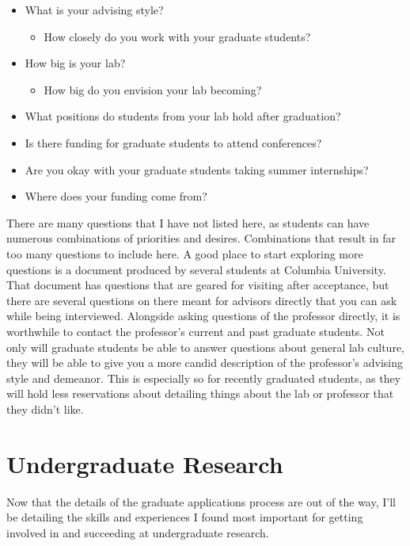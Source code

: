 \documentclass[12pt]{article}
\begin{document}
\begin{itemize}
    \item What is your advising style?
    \begin{itemize}
        \item How closely do you work with your graduate students?
    \end{itemize}
    \item How big is your lab?
    \begin{itemize}
        \item How big do you envision your lab becoming?
    \end{itemize}
    \item What positions do students from your lab hold after graduation?
    \item Is there funding for graduate students to attend conferences?
    \item Are you okay with your graduate students taking summer internships?
    \item Where does your funding come from?
\end{itemize}

There are many questions that I have not listed here, as students can have numerous combinations of priorities and desires. Combinations that result in far too many questions to include here. A good place to start exploring more questions is a document produced by several students at Columbia University. \cite{columbiaquestions} That document has questions that are geared for visiting after acceptance, but there are several questions on there meant for advisors directly that you can ask while being interviewed. Alongside asking questions of the professor directly, it is worthwhile to contact the professor's current and past graduate students. Not only will graduate students be able to answer questions about general lab culture, they will be able to give you a more candid description of the professor's advising style and demeanor. This is especially so for recently graduated students, as they will hold less reservations about detailing things about the lab or professor that they didn't like.

\section{Undergraduate Research}

Now that the details of the graduate applications process are out of the way, I’ll be detailing the skills and experiences I found most important for getting involved in and succeeding at undergraduate research.
\end{document}
